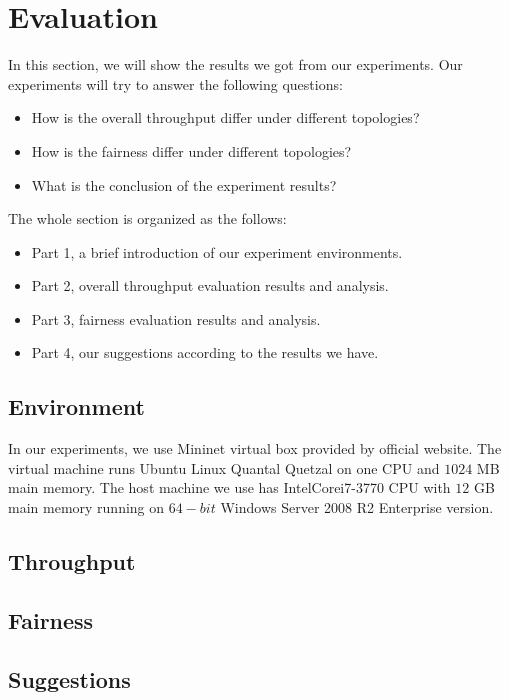 \section{Evaluation} \label{sec:evaluation}

In this section, we will show the results we got from our experiments. Our experiments will try to 
answer the following questions:
\begin{itemize}
    \item How is the overall throughput differ under different topologies?
    \item How is the fairness differ under different topologies?
    \item What is the conclusion of the experiment results?
\end{itemize}

The whole section is organized as the follows:
\begin{itemize}
    \item Part 1, a brief introduction of our experiment environments.
    \item Part 2, overall throughput evaluation results and analysis.
    \item Part 3, fairness evaluation results and analysis.
    \item Part 4, our suggestions according to the results we have.
\end{itemize}

\subsection{Environment} \label{subsec:environment}
In our experiments, we use Mininet virtual box provided by official website\cite{Mininet:official}. 
The virtual machine runs Ubuntu Linux Quantal Quetzal on one CPU and $1024$ MB main memory.
The host machine we use has Intel\textregistered Core\texttrademark i7-3770 CPU with $12$ GB main memory running on
$64-bit$ Windows Server 2008 R2 Enterprise version.

\subsection{Throughput} \label{subsec:throughtput}

\subsection{Fairness} \label{subsec:fainess}

\subsection{Suggestions} \label{subsec:suggestions}

